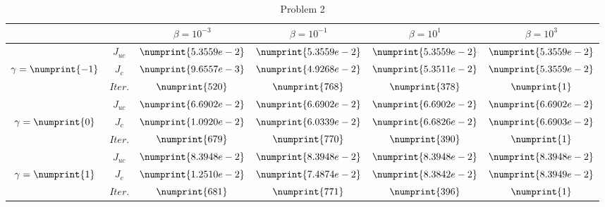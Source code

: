 \begin{table}
\begin{tabular}{ ||c|| c | c | c | c | c ||}
\hline
& & $\beta = 10^{-3}$ & $\beta = 10^{-1}$ & $\beta = 10^{1}$ & $\beta = 10^{3}$  \\
\hline
 & $J_{uc}$ & $\numprint{5.3559e-2}$ & $\numprint{5.3559e-2}$ & $\numprint{5.3559e-2}$ & $\numprint{5.3559e-2}$ \\
$\gamma= \numprint{-1}$  & $J_c$ & $\numprint{9.6557e-3}$ & $\numprint{4.9268e-2}$ & $\numprint{5.3511e-2}$ & $\numprint{5.3559e-2}$ \\
& $Iter.$ & $\numprint{520}$ & $\numprint{768}$ & $\numprint{378}$ & $\numprint{1}$ \\
\hline
 & $J_{uc}$ & $\numprint{6.6902e-2}$ & $\numprint{6.6902e-2}$ & $\numprint{6.6902e-2}$ & $\numprint{6.6902e-2}$ \\
$\gamma= \numprint{0}$  & $J_c$ & $\numprint{1.0920e-2}$ & $\numprint{6.0339e-2}$ & $\numprint{6.6826e-2}$ & $\numprint{6.6903e-2}$ \\
& $Iter.$ & $\numprint{679}$ & $\numprint{770}$ & $\numprint{390}$ & $\numprint{1}$ \\
\hline
 & $J_{uc}$ & $\numprint{8.3948e-2}$ & $\numprint{8.3948e-2}$ & $\numprint{8.3948e-2}$ & $\numprint{8.3948e-2}$ \\
$\gamma= \numprint{1}$  & $J_c$ & $\numprint{1.2510e-2}$ & $\numprint{7.4874e-2}$ & $\numprint{8.3842e-2}$ & $\numprint{8.3949e-2}$ \\
& $Iter.$ & $\numprint{681}$ & $\numprint{771}$ & $\numprint{396}$ & $\numprint{1}$ \\
\hline
\end{tabular}
\caption{Problem 2}
\label{TabS5:Prob2}
\end{table}
